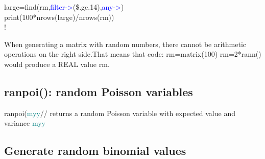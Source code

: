 \begin{itemize}
\begin{example}[rannex]
large=\textcolor{VioletRed}{find}(rm,\textcolor{blue}{filter->}(\$.ge.14),\textcolor{blue}{any->})\\
\textcolor{VioletRed}{print}(100*nrows(large)/\textcolor{VioletRed}{nrows}(rm))\\
!
\end{example}
\begin{note}
When generating a matrix with random numbers, there cannot be
arithmetic operations on the right side.That means that code:\newline
rm=\textcolor{VioletRed}{matrix}(100)\newline
rm=2*rann()\newline
would produce a REAL value rm.
\end{note}

\subsection{\textcolor{VioletRed}{ranpoi}(): random Poisson variables}
\label{ranpoi}
\textcolor{VioletRed}{ranpoi}(\textcolor{teal}{myy}//
returns a random Poisson variable with expected value and variance \textcolor{teal}{myy}
\subsection{Generate random binomial values}
\label{ranbin}


\end{itemize}
